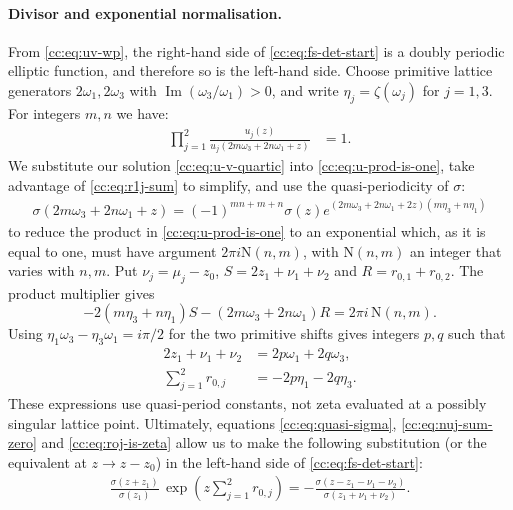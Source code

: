 \documentclass[11pt,a4paper]{article}
\begin{document}
\paragraph{Divisor and exponential normalisation.}
From \eqref{cc:eq:uv-wp}, the right-hand side of \eqref{cc:eq:fs-det-start} is a doubly periodic elliptic function, and therefore so is the left-hand side. Choose primitive lattice generators $2\omega_1,2\omega_3$ with $\operatorname{Im}(\omega_3/\omega_1)>0$, and write $\eta_j=\zeta(\omega_j)$ for $j=1,3$.
For integers $m,n$ we have:
\begin{align}
\prod_{j=1}^{2} \frac{u_j{\left(z\right)}}{u_j{\left(2 m {\omega}_{3} + 2 n {\omega}_{1} + z\right)}} & = 1. \label{cc:eq:u-prod-is-one}
\end{align}
We substitute our solution \eqref{cc:eq:u-v-quartic} into \eqref{cc:eq:u-prod-is-one}, take advantage of \eqref{cc:eq:r1j-sum} to simplify, and use the quasi-periodicity of $\sigma$:
\begin{align}
\sigma{\left(2 m {\omega}_{3} + 2 n {\omega}_{1} + z\right)} = \left(-1\right)^{m n + m + n} \sigma{\left(z\right)} e^{\left(2 m {\omega}_{3} + 2 n {\omega}_{1} + 2 z\right) \left(m\eta_3+n\eta_1\right)} \label{cc:eq:quasi-sigma}
\end{align}
to reduce the product in \eqref{cc:eq:u-prod-is-one} to an exponential which, as it is equal to one, must have argument $2\pi i \mathrm{N}(n,m)$, with $\mathrm{N}(n,m)$ an integer that varies with $n,m$.
Put $\nu_j=\mu_j-z_0$, $S=2z_1+\nu_1+\nu_2$ and $R=r_{0,1}+r_{0,2}$.
The product multiplier gives
\begin{equation}
-2(m\eta_3+n\eta_1)S-(2m\omega_3+2n\omega_1)R=2\pi i\,\mathrm N(n,m).
\label{cc:eq:exp-arg-is-one}
\end{equation}
Using $\eta_1\omega_3-\eta_3\omega_1=i\pi/2$ for the two primitive shifts gives integers $p,q$ such that
\begin{align}
2z_1+\nu_1+\nu_2&=2p\omega_1+2q\omega_3,\label{cc:eq:nuj-sum-zero}\\
\sum_{j=1}^2 r_{0,j}&=-2p\eta_1-2q\eta_3.\label{cc:eq:roj-is-zeta}
\end{align}
These expressions use quasi-period constants, not zeta evaluated at a possibly singular lattice point.
Ultimately, equations \eqref{cc:eq:quasi-sigma}, \eqref{cc:eq:nuj-sum-zero} and \eqref{cc:eq:roj-is-zeta} allow us to make the following substitution (or the equivalent at $z\rightarrow z - z_0$) in the left-hand side of \eqref{cc:eq:fs-det-start}:
\begin{align}
\frac{\sigma{\left(z + z_1 \right)}}{\sigma{\left(z_1 \right)}}\,\exp{\left(z \sum\limits_{j=1}^{2} {r}_{0,j}\right)} = - \frac{\sigma{\left(z - z_1 - {\nu}_{1} - {\nu}_{2}\right)}}{\sigma{\left(z_1 + {\nu}_{1} + {\nu}_{2}\right)}}.
\end{align}
\end{document}
